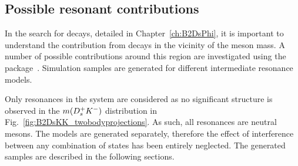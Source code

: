 

\subsection{Possible resonant contributions}
\label{sec:B2DsKK_possible_res}

In the search for \decay{\Bp}{\Dsp\phiz} decays, detailed in Chapter~\ref{ch:B2DsPhi}, it is important to understand the contribution from \decay{\Bp}{\Dsp\Kp\Km} decays in the vicinity of the \phiz meson mass.
A number of possible contributions around this region are investigated using the \laurapp package~\cite{1711.09854}. Simulation samples are generated for different intermediate resonance models.

Only resonances in the \Kp\Km system are considered as no significant structure is observed in the $m({{D}^+_{s}}{{K}^-})$ distribution in Fig.~\ref{fig:B2DsKK_twobodyprojections}. As such, all resonances are neutral mesons. The models are generated separately, therefore the effect of interference between any combination of states has been entirely neglected.    
The generated samples are described in the following sections.


